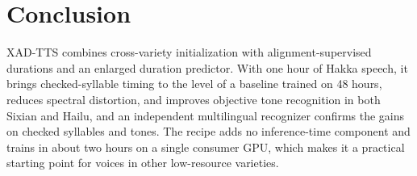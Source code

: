 \documentclass[conference,a4paper]{IEEEtran}
\begin{document}
\section{Conclusion}
XAD-TTS combines cross-variety initialization with alignment-supervised durations and an enlarged duration predictor. With one hour of Hakka speech, it brings checked-syllable timing to the level of a baseline trained on 48 hours, reduces spectral distortion, and improves objective tone recognition in both Sixian and Hailu, and an independent multilingual recognizer confirms the gains on checked syllables and tones. The recipe adds no inference-time component and trains in about two hours on a single consumer GPU, which makes it a practical starting point for voices in other low-resource varieties.




\end{document}
